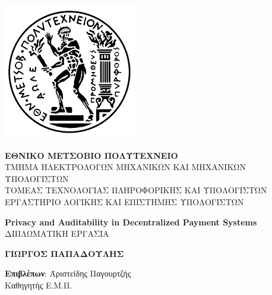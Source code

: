 \newpage
\hspace{10pt}
\newpage
\includegraphics[scale=0.5]{images/ntua.png}
\noindent
\parbox[b]{0.6\textwidth}{
\flushleft
\textbf{\Large{Ε}\large{ΘΝΙΚΟ}
\Large{Μ}\large{ΕΤΣΟΒΙΟ}
\Large{Π}\large{ΟΛΥΤΕΧΝΕΙΟ}} \\
\normalsize{Τ}\small{ΜΗΜΑ}
\normalsize{Η}\small{ΛΕΚΤΡΟΛΟΓΩΝ}
\normalsize{Μ}\small{ΗΧΑΝΙΚΩΝ}
\normalsize{Κ}\small{ΑΙ}
\normalsize{Μ}\small{ΗΧΑΝΙΚΩΝ}
\normalsize{Υ}\small{ΠΟΛΟΓΙΣΤΩΝ} \\
\vspace{2ex}
\normalsize{Τ}\small{ΟΜΕΑΣ}
\normalsize{Τ}\small{ΕΧΝΟΛΟΓΙΑΣ}
\normalsize{Π}\small{ΛΗΡΟΦΟΡΙΚΗΣ}
\normalsize{Κ}\small{ΑΙ}
\normalsize{Υ}\small{ΠΟΛΟΓΙΣΤΩΝ} \\
\normalsize{Ε}\small{ΡΓΑΣΤΗΡΙΟ} 
\normalsize{Λ}\small{ΟΓΙΚΗΣ}
\normalsize{Κ}\small{ΑΙ}
\normalsize{Ε}\small{ΠΙΣΤΗΜΗΣ}
\normalsize{Υ}\small{ΠΟΛΟΓΙΣΤΩΝ} \\
}

\begin{center}
\vspace{8ex}
\large \textbf{Privacy and Auditability in Decentralized Payment Systems} \\
\vspace{10ex}
\large
ΔΙΠΛΩΜΑΤΙΚΗ ΕΡΓΑΣΙΑ \\
\vspace{2ex}
\parbox[c]{0.4\textwidth} { \center\textbf{
ΓΙΩΡΓΟΣ ΠΑΠΑΔΟΥΛΗΣ}}
\vspace{10ex}
\flushleft
\begin{tabbing}
	\textbf{Επιβλέπων}: \= Αριστείδης Παγουρτζής \\
			    \> Καθηγητής Ε.Μ.Π.
\end{tabbing}
\end{center}

